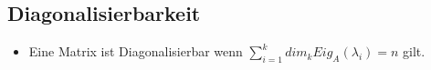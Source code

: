 \subsection{Diagonalisierbarkeit}
\begin{itemize}
    \item Eine Matrix ist Diagonalisierbar wenn $\sum\limits_{i=1}^{k}dim_kEig_A(\lambda_i)=n$ gilt.
\end{itemize}